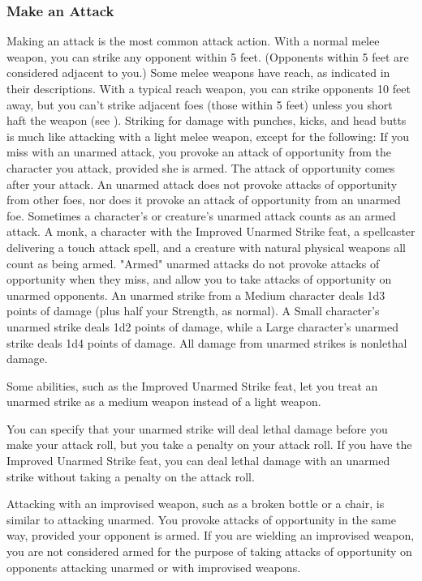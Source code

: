 \subsubsection{Make an Attack}
Making an attack is the most common attack action.
 With a normal melee weapon, you can strike any opponent within 5 feet. (Opponents within 5 feet are considered adjacent to you.) Some melee weapons have reach, as indicated in their descriptions. With a typical reach weapon, you can strike opponents 10 feet away, but you can't strike adjacent foes (those within 5 feet) unless you short haft the weapon (see ).
 Striking for damage with punches, kicks, and head butts is much like attacking with a light melee weapon, except for the following:
 If you miss with an unarmed attack, you provoke an attack of opportunity from the character you attack, provided she is armed. The attack of opportunity comes after your attack. An unarmed attack does not provoke attacks of opportunity from other foes, nor does it provoke an attack of opportunity from an unarmed foe.
 Sometimes a character's or creature's unarmed attack counts as an armed attack. A monk, a character with the Improved Unarmed Strike feat, a spellcaster delivering a touch attack spell, and a creature with natural physical weapons all count as being armed. "Armed" unarmed attacks do not provoke attacks of opportunity when they miss, and allow you to take attacks of opportunity on unarmed opponents.
 An unarmed strike from a Medium character deals 1d3 points of damage (plus half your Strength, as normal). A Small character's unarmed strike deals 1d2 points of damage, while a Large character's unarmed strike deals 1d4 points of damage. All damage from unarmed strikes is nonlethal damage.

\par Some abilities, such as the Improved Unarmed Strike feat, let you treat an unarmed strike as a medium weapon instead of a light weapon.

 You can specify that your unarmed strike will deal lethal damage before you make your attack roll, but you take a  penalty on your attack roll. If you have the Improved Unarmed Strike feat, you can deal lethal damage with an unarmed strike without taking a penalty on the attack roll.

 Attacking with an improvised weapon, such as a broken bottle or a chair, is similar to attacking unarmed. You provoke attacks of opportunity in the same way, provided your opponent is armed. If you are wielding an improvised weapon, you are not considered armed for the purpose of taking attacks of opportunity on opponents attacking unarmed or with improvised weapons.


